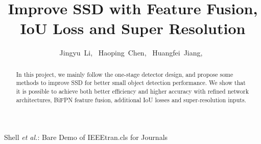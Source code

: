 \documentclass[journal,conference]{IEEEtran}
\begin{document}
\newcommand{\code}[1]{\colorbox[rgb]{0.95,0.95,0.95}{#1}}

%
\title{Improve SSD with Feature Fusion, \\IoU Loss and Super Resolution}
%
%
%

\author{
  Jingyu~Li,~
  Haoping~Chen,~
  Huangfei~Jiang,~
}

%
{Shell \MakeLowercase{\textit{et al.}}: Bare Demo of IEEEtran.cls for Journals}
%


\maketitle

\begin{abstract}
  In this project, we mainly follow the one-stage detector design, and propose some methods to improve SSD for better small object detection performance. We show that it is possible to achieve both better efficiency and higher accuracy with refined network architectures, BiFPN feature fusion, additional IoU losses and super-resolution inputs.
\end{abstract}
\end{document}
